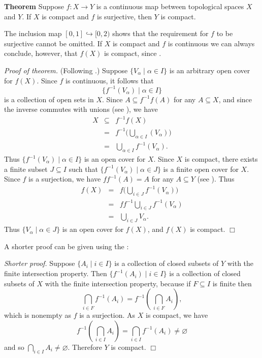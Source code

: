 \documentclass[12pt]{article}
\def\emptyset{\varnothing}
\begin{document}

{\bf Theorem} \cite{singer, kelley} 
Suppose $f\colon X\to Y$ is a continuous map 
between topological spaces $X$ and $Y$. 
If $X$ is compact and $f$ is surjective, then $Y$ is compact.

The inclusion map $[0,1]\hookrightarrow[0,2)$ shows that the requirement for $f$ to be surjective cannot be omitted.
If $X$ is compact and $f$ is continuous we can always conclude, however, that $f(X)$ is compact, since .

\emph{Proof of theorem.} (Following \cite{singer}.)
Suppose $\{V_\alpha \mid \alpha \in I\}$ is an arbitrary
open cover for $f(X)$. Since $f$ is continuous, it follows
that 
$$\{f^{-1} (V_\alpha) \mid \alpha \in I\}$$
is a collection of open sets in $X$. 
Since $A\subseteq f^{-1} f (A)$ for any $A\subseteq X$,
and since the inverse commutes with unions 
(see ), 
we have 
\begin{eqnarray*}
X &\subseteq & f^{-1} f(X) \\
  &= & f^{-1} \big( \bigcup_{\alpha \in I} (V_\alpha)\big) \\
  &=& \bigcup_{\alpha \in I} f^{-1}(V_\alpha).
\end{eqnarray*}
Thus $\{ f^{-1}(V_\alpha) \mid \alpha \in I\}$ is an open cover for $X$. 
Since $X$ is compact, there exists a finite subset $J\subseteq I$ 
such that $\{ f^{-1}(V_\alpha) \mid \alpha \in J\}$ is a 
finite open cover for $X$. 
Since $f$ is a surjection, we have $ff^{-1}(A)=A$ for any $A\subseteq Y$
(see ). Thus 
\begin{eqnarray*}
f(X) &= & f \big(\bigcup_{i\in J} f^{-1}(V_\alpha)\big)\\
     &= & ff^{-1} \bigcup_{i\in J} f^{-1}(V_\alpha)\\
     &=&  \bigcup_{i\in J} V_\alpha.
\end{eqnarray*}
Thus $\{ V_\alpha \mid \alpha \in J\}$ is an open cover for $f(X)$,
and $f(X)$ is compact.
$\Box$

A shorter proof can be given using the
:

\emph{Shorter proof.}
Suppose $\{A_i\mid i\in I\}$ is a collection of closed
subsets of $Y$ with the finite intersection property.
Then $\{f^{-1}(A_i)\mid i\in I\}$ is a collection of closed subsets of $X$
with the finite intersection property,
because if $F\subseteq I$ is finite then
\[
 \bigcap_{i\in F} f^{-1}(A_i) = f^{-1}\!\left(\,\bigcap_{i\in F} A_i\!\right),
\]
which is nonempty as $f$ is a surjection.
As $X$ is compact, we have
\[
 f^{-1}\left(\,\bigcap_{i\in I} A_i\!\right) = \bigcap_{i\in I} f^{-1}(A_i) \neq \emptyset
\]
and so $\bigcap_{i\in I} A_i\neq \emptyset$.
Therefore $Y$ is compact.
$\Box$
\end{document}
